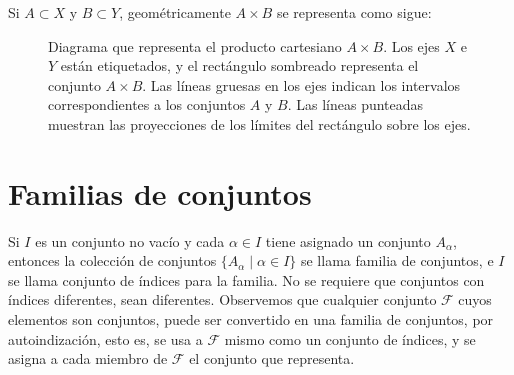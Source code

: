 Si $A \subset X$ y $B \subset Y$, geométricamente $A \times B$ se representa como sigue:
\begin{figure}[h!]
    \centering
    \caption{Diagrama que representa el producto cartesiano $A \times B$. Los ejes $X$ e $Y$ están etiquetados, y el rectángulo sombreado representa el conjunto $A \times B$. Las líneas gruesas en los ejes indican los intervalos correspondientes a los conjuntos $A$ y $B$. Las líneas punteadas muestran las proyecciones de los límites del rectángulo sobre los ejes.}
\end{figure}

\section{Familias de conjuntos}

Si $I$ es un conjunto no vacío y cada $\alpha \in I$ tiene asignado un conjunto $A_\alpha$, entonces la colección de conjuntos $\{A_\alpha \mid \alpha \in I\}$ se llama familia de conjuntos, e $I$ se llama conjunto de índices para la familia. No se requiere que conjuntos con índices diferentes, sean diferentes. Observemos que cualquier conjunto $\mathcal{F}$ cuyos elementos son conjuntos, puede ser convertido en una familia de conjuntos, por autoindización, esto es, se usa a $\mathcal{F}$ mismo como un conjunto de índices, y se asigna a cada miembro de $\mathcal{F}$ el conjunto que representa.


